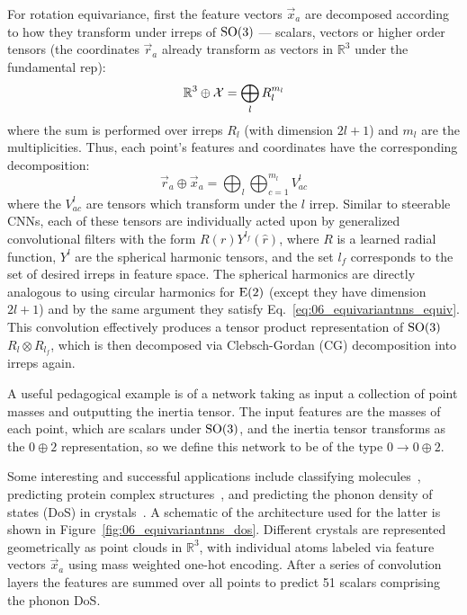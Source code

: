 For rotation equivariance, first the feature vectors $\vec{x}_a$ are decomposed according to how they transform under irreps of $\SO[3]$ --- scalars, vectors or higher order tensors (the coordinates $\vec{r}_a$ already transform as vectors in $\mathbb R^3$ under the fundamental rep): 
\begin{equation}
    \mathbb R^3 \oplus \mathcal{X} = \bigoplus _l R_l^{m_l}
\end{equation}
where the sum is performed over irreps $R_l$ (with dimension $2l+1$) and $m_l$ are the multiplicities. 
Thus, each point's features and coordinates have the corresponding decomposition:
\begin{equation}
    \vec{r}_a \oplus \vec{x}_a = \bigoplus _l \bigoplus _{c=1}^{m_l} V^l_{ac}
\end{equation}
where the $V^l_{ac}$ are tensors which transform under the $l$ irrep. 
Similar to steerable CNNs, each of these tensors are individually acted upon by generalized convolutional filters with the form $R(r)Y^{l_f}(\hat{r})$, where $R$ is a learned radial function, $Y^l$ are the spherical harmonic tensors, and the set $l_f$ corresponds to the set of desired irreps in feature space. The spherical harmonics are directly analogous to using circular harmonics for $\EE[2]$ (except they have dimension $2l+1$) and by the same argument they satisfy Eq.~\ref{eq:06_equivariantnns_equiv}. 
This convolution effectively produces a tensor product representation of $\SO[3]$ $R_{l} \otimes R_{l_f}$, which is then decomposed via Clebsch-Gordan (CG) decomposition into irreps again.

A useful pedagogical example is of a network taking as input a collection of point masses and outputting the inertia tensor. 
The input features are the masses of each point, which are scalars under $\SO[3]$, and the inertia tensor transforms as the $0 \oplus 2$ representation, so we define this network to be of the type $0 \rightarrow 0 \oplus 2$. 

Some interesting and successful applications include classifying molecules~\cite{miller2020relevance}, predicting protein complex structures~\cite{Eismann2020HierarchicalRN}, and predicting the phonon density of states (DoS) in crystals~\cite{chen2020direct}. 
A schematic of the architecture used for the latter is shown in Figure~\ref{fig:06_equivariantnns_dos}. 
Different crystals are represented geometrically as point clouds in $\mathbb R^3$, with individual atoms labeled via feature vectors $\vec{x}_a$ using mass weighted one-hot encoding. 
After a series of convolution layers the features are summed over all points to predict 51 scalars comprising the phonon DoS.


